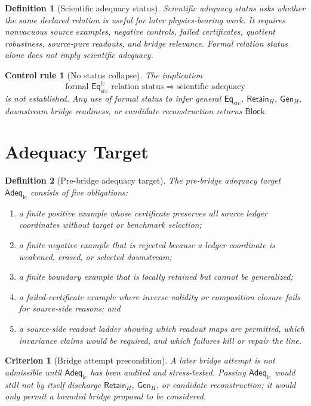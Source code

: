 \documentclass[11pt]{article}
\newcommand{\EqSrc}{\mathsf{Eq}_{\mathrm{src}}}
\newcommand{\EqLC}{\mathsf{Eq}_{\mathrm{src}}^{\mathrm{lc}}}
\newcommand{\AdeqLC}{\mathsf{Adeq}_{\mathrm{lc}}}
\newcommand{\RetainH}{\mathsf{Retain}_{H}}
\newcommand{\GenH}{\mathsf{Gen}_{H}}
\newcommand{\Block}{\mathsf{Block}}
\newtheorem{definition}{Definition}
\newtheorem{criterion}{Criterion}
\newtheorem{controlrule}{Control rule}
\begin{document}
\begin{definition}[Scientific adequacy status]
Scientific adequacy status asks whether the same declared relation is
useful for later physics-bearing work. It requires nonvacuous source
examples, negative controls, failed certificates, quotient robustness,
source-pure readouts, and bridge relevance. Formal relation status alone
does not imply scientific adequacy.
\end{definition}

\begin{controlrule}[No status collapse]
The implication
\[
    \text{formal }\EqLC\text{ relation status}
    \Longrightarrow
    \text{scientific adequacy}
\]
is not established. Any use of formal status to infer general
\(\EqSrc\), \(\RetainH\), \(\GenH\), downstream bridge readiness, or
candidate reconstruction returns \(\Block\).
\end{controlrule}

\section{Adequacy Target}

\begin{definition}[Pre-bridge adequacy target]
The pre-bridge adequacy target \(\AdeqLC\) consists of five obligations:
\begin{enumerate}
    \item a finite positive example whose certificate preserves all
    source ledger coordinates without target or benchmark selection;
    \item a finite negative example that is rejected because a ledger
    coordinate is weakened, erased, or selected downstream;
    \item a finite boundary example that is locally retained but cannot
    be generalized;
    \item a failed-certificate example where inverse validity or
    composition closure fails for source-side reasons; and
    \item a source-side readout ladder showing which readout maps are
    permitted, which invariance claims would be required, and which
    failures kill or repair the line.
\end{enumerate}
\end{definition}

\begin{criterion}[Bridge attempt precondition]
A later bridge attempt is not admissible until \(\AdeqLC\) has been
audited and stress-tested. Passing \(\AdeqLC\) would still not by
itself discharge \(\RetainH\), \(\GenH\), or candidate reconstruction;
it would only permit a bounded bridge proposal to be considered.
\end{criterion}
\end{document}
